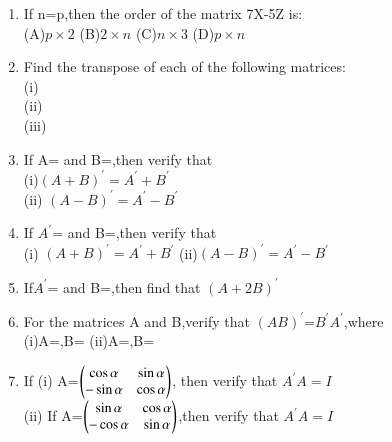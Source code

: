 \begin{enumerate}[label=\arabic*.,ref=\thesubsection.\theenumi]
 (D)k=2,p=3\\
\item If n=p,then the order of the matrix 7X-5Z is:\\
(A)$p \times 2$ (B)$2 \times n$ (C)$n \times 3$ (D)$p \times n$\\
\item Find the transpose of each of the following matrices:\\
(i)\\ (ii)\\ (iii)\\
\item If A= and B=,then verify that\\
(i)$(A+B)^{'}=A^{'}+B^{'}$ \\(ii) $(A-B)^{'}=A^{'}-B^{'}$\\
\item If $A^{'}$= and B=,then verify that\\
(i) $(A+B)^{'}=A^{'}+B^{'}$ (ii)$(A-B)^{'}=A^{'}-B^{'}$
\item If$ A^{'}$= and B=,then find that $(A+2B)^{'}$\\
\item For the matrices A and B,verify that $(AB)^{'}$=$B^{'}A^{'}$,where\\
(i)A=,B= (ii)A=,B=
\item If (i)  A=$\begin{pmatrix}\cos\alpha &\sin\alpha\\-\sin\alpha &\cos\alpha\end{pmatrix}$, then verify that $A^{'}A=I$\\
        (ii) If A=$\begin{pmatrix}\sin\alpha &\cos\alpha\\-\cos\alpha &\sin\alpha\end{pmatrix}$,then verify that $A^{'}A=I$\\

\end{enumerate}
